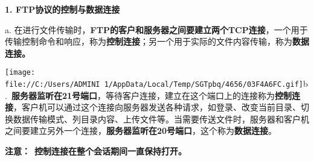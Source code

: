 {\textbf{1. FTP协议的控制与数据连接}}

a.
在进行文件传输时，{\textbf{FTP的客户和服务器之间要建立两个TCP连接}}，一个用于传输控制命令和响应，称为\textbf{控制连接}；另一个用于实际的文件内容传输，称为\textbf{数据连接。}

\texttt{[image: file://C:/Users/ADMINI~1/AppData/Local/Temp/SGTpbq/4656/03F4A6FC.gif]}b.~\textbf{服务器监听在21号端口}，等待客户连接，建立在这个端口上的连接称为\textbf{控制连接}，客户机可以通过这个连接向服务器发送各种请求，如登录、改变当前目录、切换数据传输模式、列目录内容、上传文件等。当需要传送文件时，服务器和客户机之间要建立另外一个连接，{\textbf{服务器监听在20号端口}，}这个称为\textbf{数据连接}。

{\textbf{{注意：}}{~}\textbf{控制连接在整个会话期间一直保持打开。}}
